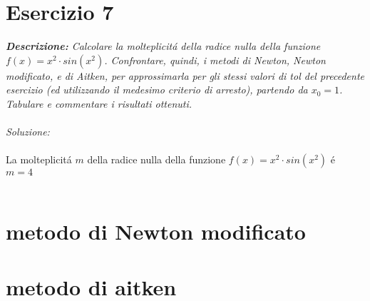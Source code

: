 \section{Esercizio 7}

\textit{\textbf{Descrizione:} Calcolare la molteplicit\'a della radice nulla della funzione $f(x) = x^{2} \cdot sin(x^{2})$. Confrontare, quindi, i metodi di Newton, Newton modificato, e di Aitken, per approssimarla per gli stessi valori di tol del precedente esercizio (ed utilizzando il medesimo criterio di arresto), partendo da $x_{0}=1$. Tabulare e commentare i risultati ottenuti.}\\~\\
\emph{Soluzione:}\\~\\
La molteplicit\'a $m$ della radice nulla della funzione $f(x) = x^{2} \cdot sin(x^{2})$  \'e $m=4$
\\~\\

\section*{metodo di  Newton modificato}

\newpage

\section*{metodo di aitken}

\newpage
